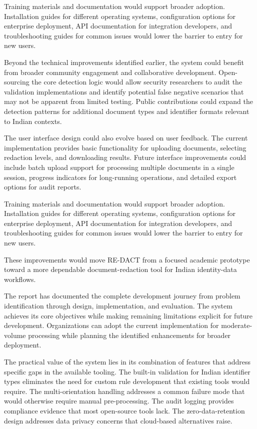 Training materials and documentation would support broader adoption. Installation guides for different operating systems, configuration options for enterprise deployment, API documentation for integration developers, and troubleshooting guides for common issues would lower the barrier to entry for new users.

\bigskip

Beyond the technical improvements identified earlier, the system could benefit from broader community engagement and collaborative development. Open-sourcing the core detection logic would allow security researchers to audit the validation implementations and identify potential false negative scenarios that may not be apparent from limited testing. Public contributions could expand the detection patterns for additional document types and identifier formats relevant to Indian contexts.

The user interface design could also evolve based on user feedback. The current implementation provides basic functionality for uploading documents, selecting redaction levels, and downloading results. Future interface improvements could include batch upload support for processing multiple documents in a single session, progress indicators for long-running operations, and detailed export options for audit reports.

Training materials and documentation would support broader adoption. Installation guides for different operating systems, configuration options for enterprise deployment, API documentation for integration developers, and troubleshooting guides for common issues would lower the barrier to entry for new users.

\bigskip

These improvements would move RE-DACT from a focused academic prototype toward a more dependable document-redaction tool for Indian identity-data workflows.

\bigskip

The report has documented the complete development journey from problem identification through design, implementation, and evaluation. The system achieves its core objectives while making remaining limitations explicit for future development. Organizations can adopt the current implementation for moderate-volume processing while planning the identified enhancements for broader deployment.

The practical value of the system lies in its combination of features that address specific gaps in the available tooling. The built-in validation for Indian identifier types eliminates the need for custom rule development that existing tools would require. The multi-orientation handling addresses a common failure mode that would otherwise require manual pre-processing. The audit logging provides compliance evidence that most open-source tools lack. The zero-data-retention design addresses data privacy concerns that cloud-based alternatives raise.

